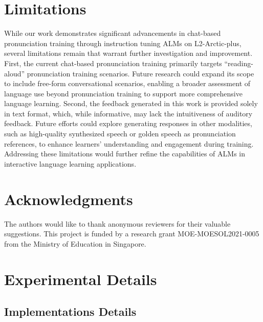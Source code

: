 \documentclass[11pt]{article}
\begin{document}
\section*{Limitations}
While our work demonstrates significant advancements in chat-based pronunciation training through instruction tuning ALMs on L2-Arctic-plus, several limitations remain that warrant further investigation and improvement. First, the current chat-based pronunciation training primarily targets ``reading-aloud'' pronunciation training scenarios. Future research could expand its scope to include free-form conversational scenarios, enabling a broader assessment of language use beyond pronunciation training to support more comprehensive language learning. Second, the feedback generated in this work is provided solely in text format, which, while informative, may lack the intuitiveness of auditory feedback. Future efforts could explore generating responses in other modalities, such as high-quality synthesized speech or golden speech as pronunciation references, to enhance learners' understanding and engagement during training. Addressing these limitations would further refine the capabilities of ALMs in interactive language learning applications.

\section*{Acknowledgments}
The authors would like to thank anonymous reviewers for their valuable suggestions. This project is funded by a research grant MOE-MOESOL2021-0005 from the Ministry of Education in Singapore.



%



\newpage
\appendix

\clearpage
\section{Experimental Details}
\label{sec:appendix}


\subsection{Implementations Details}
\end{document}

